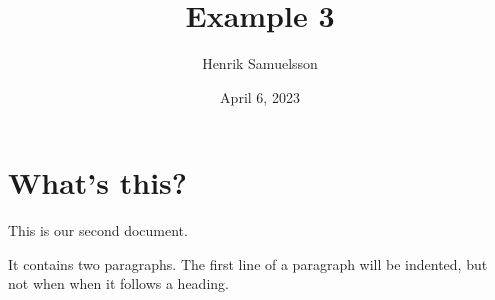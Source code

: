 \documentclass[a4paper, 11pt]{article}
\begin{document}
    \title{Example 3}
    \author{Henrik Samuelsson}
    \date{April 6, 2023}
    \maketitle
    \section{What's this?}
    This        is    our
    second document.

    It contains two paragraphs. The first line of a paragraph will be
    indented, but not when when it follows a heading.
\end{document}
